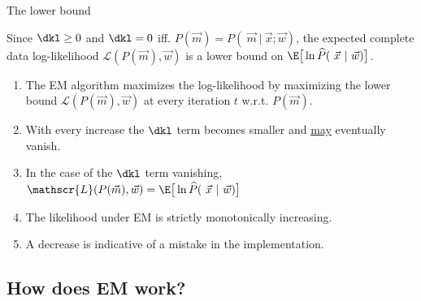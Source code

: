 \begin{frame}{The lower bound}


Since $\dkl \ge 0$ and $\dkl = 0$ iff. $P(\vec m) = P(~\vec m~|~ \vec x; \vec w)$, the expected complete data log-likelihood $\mathscr{L}(P(\vec m), \vec w)$ is a lower bound on $\E
\big\lbrack
\ln \widehat{P}(~\vec x ~|~ \vec w)
\big\rbrack$.

\pause

\begin{enumerate}[a]
\item The EM algorithm maximizes the log-likelihood by maximizing the lower bound $\mathscr{L}(P(\vec m), \vec w)$ at every iteration $t$ w.r.t. $P(\vec m)$.
\item With every increase the $\dkl$ term becomes smaller and \underline{may} eventually vanish.
\item In the case of the $\dkl$ term vanishing, $\mathscr{L}(P(\vec m), \vec w) = \E
\big\lbrack
\ln \widehat{P}(~\vec x ~|~ \vec w)
\big\rbrack$
\item The likelihood under EM is strictly monotonically increasing. 
\item A decrease is indicative of a mistake in the implementation.
\end{enumerate}

\end{frame}




\subsection{How does EM work?}

